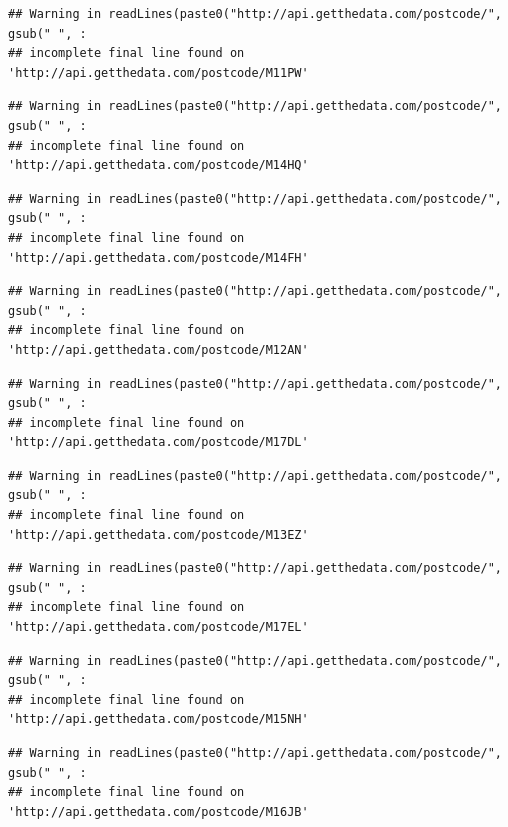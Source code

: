 \documentclass[]{book}
\begin{document}
\begin{verbatim}
## Warning in readLines(paste0("http://api.getthedata.com/postcode/", gsub(" ", :
## incomplete final line found on 'http://api.getthedata.com/postcode/M11PW'
\end{verbatim}

\begin{verbatim}
## Warning in readLines(paste0("http://api.getthedata.com/postcode/", gsub(" ", :
## incomplete final line found on 'http://api.getthedata.com/postcode/M14HQ'
\end{verbatim}

\begin{verbatim}
## Warning in readLines(paste0("http://api.getthedata.com/postcode/", gsub(" ", :
## incomplete final line found on 'http://api.getthedata.com/postcode/M14FH'
\end{verbatim}

\begin{verbatim}
## Warning in readLines(paste0("http://api.getthedata.com/postcode/", gsub(" ", :
## incomplete final line found on 'http://api.getthedata.com/postcode/M12AN'
\end{verbatim}

\begin{verbatim}
## Warning in readLines(paste0("http://api.getthedata.com/postcode/", gsub(" ", :
## incomplete final line found on 'http://api.getthedata.com/postcode/M17DL'
\end{verbatim}

\begin{verbatim}
## Warning in readLines(paste0("http://api.getthedata.com/postcode/", gsub(" ", :
## incomplete final line found on 'http://api.getthedata.com/postcode/M13EZ'
\end{verbatim}

\begin{verbatim}
## Warning in readLines(paste0("http://api.getthedata.com/postcode/", gsub(" ", :
## incomplete final line found on 'http://api.getthedata.com/postcode/M17EL'
\end{verbatim}

\begin{verbatim}
## Warning in readLines(paste0("http://api.getthedata.com/postcode/", gsub(" ", :
## incomplete final line found on 'http://api.getthedata.com/postcode/M15NH'
\end{verbatim}

\begin{verbatim}
## Warning in readLines(paste0("http://api.getthedata.com/postcode/", gsub(" ", :
## incomplete final line found on 'http://api.getthedata.com/postcode/M16JB'
\end{verbatim}
\end{document}

